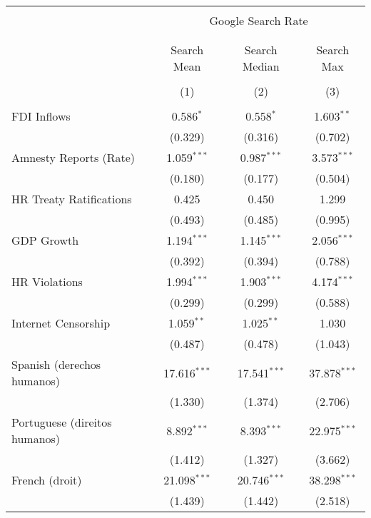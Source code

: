 
\begin{table}[!htbp] \centering 
  \caption{} 
  \label{} 
\begin{tabular}{@{\extracolsep{5pt}}lccc} 
\\[-1.8ex]\hline 
\hline \\[-1.8ex] 
 & \multicolumn{3}{c}{Google Search Rate} \\ 
\cline{2-4} 
\\[-1.8ex] & \multicolumn{3}{c}{ } \\ 
 & Search Mean & Search Median & Search Max \\ 
\\[-1.8ex] & (1) & (2) & (3)\\ 
\hline \\[-1.8ex] 
 FDI Inflows & 0.586$^{*}$ & 0.558$^{*}$ & 1.603$^{**}$ \\ 
  & (0.329) & (0.316) & (0.702) \\ 
  Amnesty Reports (Rate) & 1.059$^{***}$ & 0.987$^{***}$ & 3.573$^{***}$ \\ 
  & (0.180) & (0.177) & (0.504) \\ 
  HR Treaty Ratifications & 0.425 & 0.450 & 1.299 \\ 
  & (0.493) & (0.485) & (0.995) \\ 
  GDP Growth & 1.194$^{***}$ & 1.145$^{***}$ & 2.056$^{***}$ \\ 
  & (0.392) & (0.394) & (0.788) \\ 
  HR Violations & 1.994$^{***}$ & 1.903$^{***}$ & 4.174$^{***}$ \\ 
  & (0.299) & (0.299) & (0.588) \\ 
  Internet Censorship & 1.059$^{**}$ & 1.025$^{**}$ & 1.030 \\ 
  & (0.487) & (0.478) & (1.043) \\ 
  Spanish (derechos humanos) & 17.616$^{***}$ & 17.541$^{***}$ & 37.878$^{***}$ \\ 
  & (1.330) & (1.374) & (2.706) \\ 
  Portuguese (direitos humanos) & 8.892$^{***}$ & 8.393$^{***}$ & 22.975$^{***}$ \\ 
  & (1.412) & (1.327) & (3.662) \\ 
  French (droit) & 21.098$^{***}$ & 20.746$^{***}$ & 38.298$^{***}$ \\ 
  & (1.439) & (1.442) & (2.518) \\ 

\end{tabular}
\end{table}
